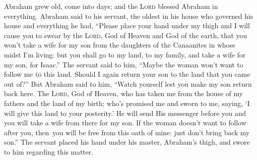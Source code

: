 
\begin{inparaenum}
     Abraham grew old, come into days; and the \textsc{Lord} blessed Abraham in everything.%
     Abraham said to his servant, the oldest in his house who governed his house and everything he had, ``Please place your hand under my thigh%
     and I will cause you to swear by the \textsc{Lord}, God of Heaven and God of the earth, that you won't take a wife for my son from the daughters of the Canaanites in whose midst I'm living:%
     but you shall go to my land, to my family, and take a wife for my son, for Isaac.''%
     The servant said to him, ``Maybe the woman won't want to follow me to this land. Should I again return your son to the land that you came out of?''%
     But Abraham said to him, ``Watch yourself lest you make my son return back here.%
     The \textsc{Lord}, God of Heaven, who has taken me from the house of my fathers and the land of my birth; who's promised me and sworn to me, saying, `I will give this land to your posterity.' He will send His messenger before you and you will take a wife from there for my son.%
     If the woman doesn't want to follow after you, then\understood\ you will be free from this oath of mine: just don't bring back my son.''%
     The servant placed his hand under his master, Abraham's thigh, and swore to him regarding this matter.%
    

\end{inparaenum}
